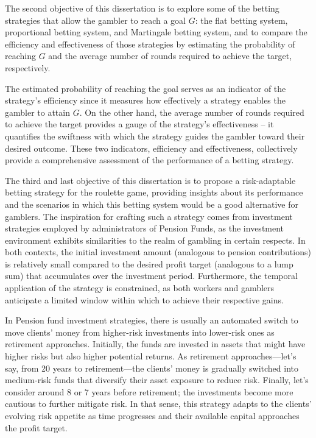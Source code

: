 \documentclass[11pt,twoside]{article}
\numberwithin{Theorem}{section}
\numberwithin{Definition}{section}
\numberwithin{Lemma}{section}
\numberwithin{Algorithm}{section}
\numberwithin{equation}{section}
\begin{document}
The second objective of this dissertation is to explore some of the betting strategies that allow the gambler to reach a goal $G$: the flat betting system, proportional betting system, and Martingale betting system, and to compare the efficiency and effectiveness of those strategies by estimating the probability of reaching $G$ and the average number of rounds required to achieve the target, respectively.

The estimated probability of reaching the goal serves as an indicator of the strategy's efficiency since it measures how effectively a strategy enables the gambler to attain $G$. On the other hand, the average number of rounds required to achieve the target provides a gauge of the strategy's effectiveness – it quantifies the swiftness with which the strategy guides the gambler toward their desired outcome. These two indicators, efficiency and effectiveness, collectively provide a comprehensive assessment of the performance of a betting strategy.

The third and last objective of this dissertation is to propose a risk-adaptable betting strategy for the roulette game, providing insights about its performance and the scenarios in which this betting system would be a good alternative for gamblers. The inspiration for crafting such a strategy comes from investment strategies employed by administrators of Pension Funds, as the investment environment exhibits similarities to the realm of gambling in certain respects. In both contexts, the initial investment amount (analogous to pension contributions) is relatively small compared to the desired profit target (analogous to a lump sum) that accumulates over the investment period. Furthermore, the temporal application of the strategy is constrained, as both workers and gamblers anticipate a limited window within which to achieve their respective gains.

In Pension fund investment strategies, there is usually an automated switch to move clients' money from higher-risk investments into lower-risk ones as retirement approaches. Initially, the funds are invested in assets that might have higher risks but also higher potential returns. As retirement approaches—let's say, from 20 years to retirement—the clients' money is gradually switched into medium-risk funds that diversify their asset exposure to reduce risk. Finally, let's consider around 8 or 7 years before retirement; the investments become more cautious to further mitigate risk. In that sense, this strategy adapts to the clients' evolving risk appetite as time progresses and their available capital approaches the profit target.
\end{document}
